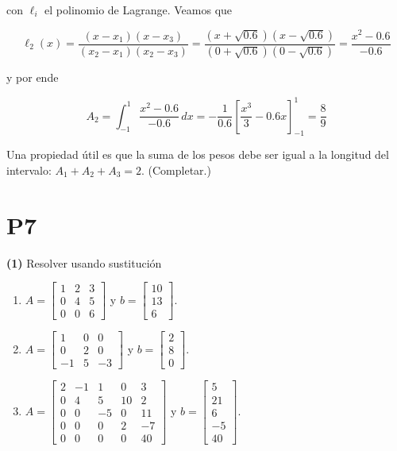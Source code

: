 \documentclass[12pt]{article}
\begin{document}
con $\ell_i$ el polinomio de Lagrange. Veamos que

$$\ell_2(x) = \frac{(x - x_1)(x - x_3)}{(x_2 - x_1)(x_2 - x_3)} = \frac{(x + \sqrt{0.6})(x - \sqrt{0.6})}{(0 + \sqrt{0.6})(0 - \sqrt{0.6})} = \frac{x^2 - 0.6}{-0.6}$$

y por ende 

$$A_2 = \int_{-1}^{1} \frac{x^2 - 0.6}{-0.6} \, dx = -\frac{1}{0.6} \left[
\frac{x^3}{3} - 0.6x \right]_{-1}^{1} = \frac{8}{9}$$

Una propiedad útil es que la suma de los pesos debe ser igual a la longitud del
intervalo: $A_1 + A_2 + A_3 = 2$. (Completar.)


\pagebreak 

\section{P7}

\begin{myframe}

\textbf{(1)} Resolver usando sustitución

\begin{enumerate}
    \item[a)] $A = \begin{bmatrix} 1 & 2 & 3 \\ 0 & 4 & 5 \\ 0 & 0 & 6 \end{bmatrix}$ y $b = \begin{bmatrix} 10 \\ 13 \\ 6 \end{bmatrix}$.

    \item[b)] $A = \begin{bmatrix} 1 & 0 & 0 \\ 0 & 2 & 0 \\ -1 & 5 & -3 \end{bmatrix}$ y $b = \begin{bmatrix} 2 \\ 8 \\ 0 \end{bmatrix}$.

    \item[c)] $A = \begin{bmatrix} 2 & -1 & 1 & 0 & 3 \\ 0 & 4 & 5 & 10 & 2 \\ 0 & 0 & -5 & 0 & 11 \\ 0 & 0 & 0 & 2 & -7 \\ 0 & 0 & 0 & 0 & 40 \end{bmatrix}$ y $b = \begin{bmatrix} 5 \\ 21 \\ 6 \\ -5 \\ 40 \end{bmatrix}$.
\end{enumerate}

\end{myframe}
\end{document}
